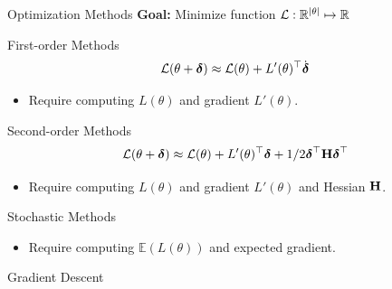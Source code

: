 \documentclass{beamer}
\begin{document}
\begin{frame}{Optimization Methods}
  \air
  \textbf{Goal:} Minimize function $\mathcal{L}: \mathbb{R}^{|\theta|} \mapsto \mathbb{R} $
  \air
  



  First-order Methods
  \[\mathcal{L}(\theta + \boldsymbol{\delta}) \approx \mathcal{L}(\theta) + L'(\theta)^\top \dot {\boldsymbol{\delta}}\]

  \begin{itemize}
  \item Require computing $L(\theta)$ and gradient $L'(\theta)$.
  \end{itemize}

  Second-order Methods
  \[\mathcal{L}(\theta + \boldsymbol{\delta}) \approx \mathcal{L}(\theta) + L'(\theta)^\top \boldsymbol{\delta} + 1/2 \boldsymbol{\delta}^\top \mathbf{H} \boldsymbol{\delta}^\top \]

  \begin{itemize}
  \item  Require computing $L(\theta)$ and gradient $L'(\theta)$ and Hessian $\mathbf{H}$.
  \end{itemize}

  Stochastic Methods
  \begin{itemize}
  \item  Require computing $\mathbb{E}(L(\theta))$ and expected gradient.
  \end{itemize}
\end{frame}


\begin{frame}{Gradient Descent}
  \begin{figure}
    \begin{algorithmic}
      \EndFor{}
      \EndWhile{}
      \State{\Return{$\theta$}}
    \end{algorithmic}
  \end{figure}  
\end{frame}
\end{document}
